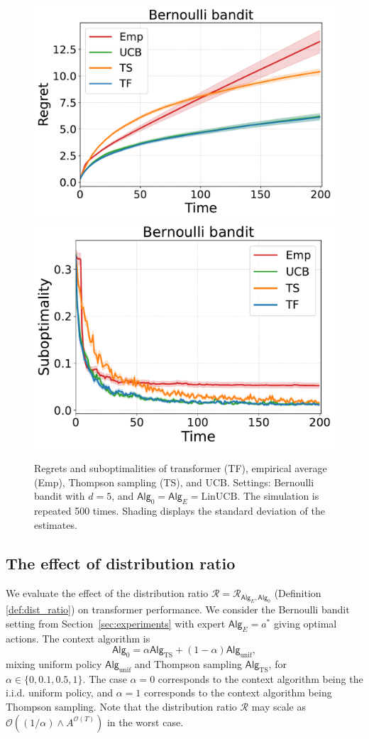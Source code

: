 \documentclass[10pt]{article}
\renewcommand{\cO}{\mathcal{O}}
\newcommand{\<}{\left\langle}
\renewcommand{\>}{\right\rangle}
\newcommand{\LinUCB}{{\mathrm{LinUCB}}}
\newcommand{\unif}{{\mathrm{unif}}}
\newcommand{\TS}{{\mathrm{TS}}}
\newcommand{\action}{{a}}
\newcommand{\totlen}{{T}}
\newcommand{\sAlg}{{\mathsf{Alg}}}
\newcommand{\osAlg}{\overline{\mathsf{Alg}}}
\newcommand{\shortexp}{{E}}
\newcommand{\distratio}{{\mathcal{R}}}
\newcommand{\Numact}{{A}}
\begin{document}
\begin{figure}[ht]
\centering  
\includegraphics[width=0.47\linewidth]{Sections/figs/record_3_cum_True.pdf}
\includegraphics[width=0.45\linewidth]{Sections/figs/record_3_cum_False.pdf}
\caption{Regrets and suboptimalities of transformer (TF), empirical average (Emp), Thompson sampling (TS), and  UCB. Settings: Bernoulli bandit with $d=5$, and $\sAlg_0=\sAlg_\shortexp=\LinUCB$. 
The simulation is repeated 500 times. Shading displays the standard deviation of the estimates. } 
\label{fig:linucb_bernoulli} 
\end{figure}

\subsection{The effect of distribution ratio}

We evaluate the effect of the distribution ratio $\distratio=\distratio_{\osAlg_{\shortexp},\sAlg_0}$ (Definition \ref{def:dist_ratio}) on transformer performance. We consider the Bernoulli bandit setting from Section~\ref{sec:experiments} with expert $\sAlg_\shortexp=\action^*$ giving optimal actions. The context algorithm is $$\sAlg_0=\alpha\sAlg_{\TS}+(1-\alpha)\sAlg_{\unif},$$
mixing uniform policy $\sAlg_{\unif}$ and Thompson sampling $\sAlg_{\TS}$, for $\alpha\in\{0,0.1,0.5,1\}$. The case $\alpha=0$ corresponds to the context algorithm being the i.i.d. uniform policy, and  $\alpha=1$ corresponds to the context algorithm being Thompson sampling. Note that the distribution ratio $\distratio$ may scale as $\cO((1/\alpha)\wedge \Numact^{\cO(\totlen)})$ in the worst case. 
\end{document}
